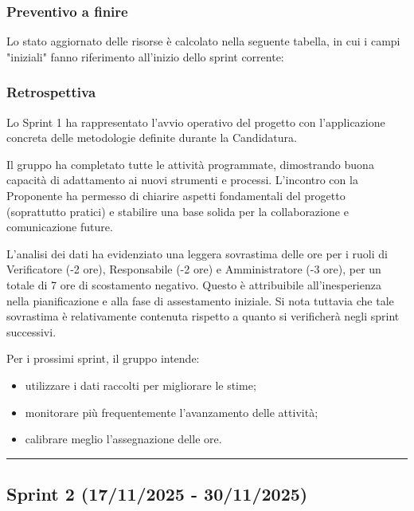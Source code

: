 \documentclass[10pt, letterpaper]{article}
\begin{document}
\subsubsection{Preventivo a finire}
Lo stato aggiornato delle risorse è calcolato nella seguente tabella, in cui i campi "iniziali" fanno riferimento all'inizio dello sprint corrente:


\subsubsection{Retrospettiva}
Lo Sprint 1 ha rappresentato l'avvio operativo del progetto con l'applicazione concreta delle metodologie definite durante la Candidatura.

Il gruppo ha completato tutte le attività programmate, dimostrando buona capacità di adattamento ai nuovi strumenti e processi. L'incontro con la Proponente ha permesso di chiarire aspetti fondamentali del progetto (soprattutto pratici) e stabilire una base solida per la collaborazione e comunicazione future.

L'analisi dei dati ha evidenziato una leggera sovrastima delle ore per i ruoli di Verificatore (-2 ore), Responsabile (-2 ore) e Amministratore (-3 ore), per un totale di 7 ore di scostamento negativo. Questo è attribuibile all'inesperienza nella pianificazione e alla fase di assestamento iniziale. Si nota tuttavia che tale sovrastima è relativamente contenuta rispetto a quanto si verificherà negli sprint successivi.

Per i prossimi sprint, il gruppo intende:
\begin{itemize}
    \item utilizzare i dati raccolti per migliorare le stime;
    \item monitorare più frequentemente l'avanzamento delle attività;
    \item calibrare meglio l'assegnazione delle ore.
\end{itemize}

\vspace{1em}
\hrule
\vspace{1em}

\subsection{Sprint 2 (17/11/2025 - 30/11/2025)}
\end{document}
